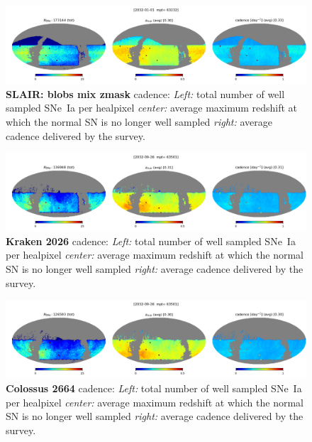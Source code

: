 \begin{figure}[h!]
  \begin{center}
    \includegraphics[width=\linewidth]{Figures/blobs_mix_zmask10yrs_64_maps.png}
    \caption{{\bf SLAIR: blobs mix zmask} cadence: {\em Left:} total number of well
      sampled SNe~Ia per healpixel {\em center:} average maximum
      redshift at which the normal SN is no longer well sampled {\em
        right:} average cadence delivered by the survey.}
    \label{fig:blobs_mix_zmask}
  \end{center}
\end{figure}

\begin{figure}[h!]
  \begin{center}
    \includegraphics[width=\linewidth]{Figures/kraken_2026_64_maps.png}
    \caption{{\bf Kraken 2026} cadence: {\em Left:} total number of well
      sampled SNe~Ia per healpixel {\em center:} average maximum
      redshift at which the normal SN is no longer well sampled {\em
        right:} average cadence delivered by the survey.}
  \end{center}
  \label{fig:kraken_2026}
\end{figure}

\begin{figure}[h!]
  \begin{center}
    \includegraphics[width=\linewidth]{Figures/colossus_2664_64_maps.png}
    \caption{{\bf Colossus 2664} cadence: {\em Left:} total number of well
      sampled SNe~Ia per healpixel {\em center:} average maximum
      redshift at which the normal SN is no longer well sampled {\em
        right:} average cadence delivered by the survey.}
    \label{fig:colossus_2664}
  \end{center}
\end{figure}

